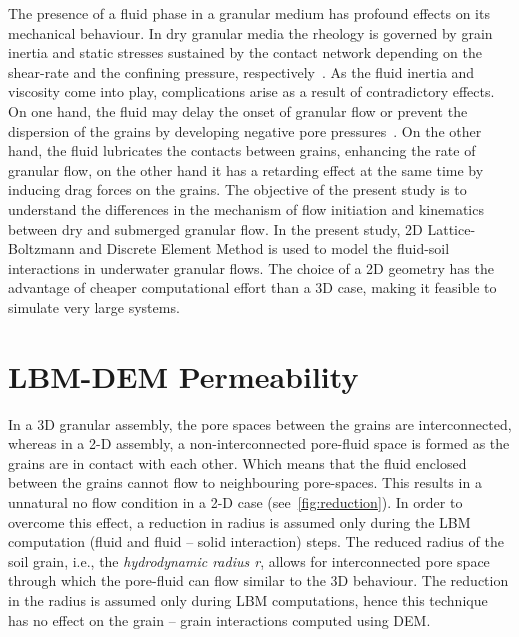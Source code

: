 The presence of a fluid phase in a granular medium has profound effects on its 
mechanical behaviour. In dry granular media the rheology is governed by grain 
inertia and static stresses sustained by the contact network depending on the 
shear-rate and the confining pressure, respectively~\citep{Midi2004}. As the 
fluid inertia and viscosity come into play, complications arise as a result of 
contradictory effects. On one hand, the fluid may delay the onset of
granular flow or prevent the dispersion of the grains by
developing negative pore pressures~\citep{Pailha2008,Topin2011}. On the other
hand, the fluid lubricates the contacts between grains, enhancing the rate of 
granular flow, on the other hand it has a retarding effect at the same time by 
inducing drag forces on the grains. The objective of the present study is to 
understand 
the differences in the mechanism of flow initiation and kinematics between dry 
and submerged granular flow. In the present study, 2D Lattice-Boltzmann and 
Discrete Element Method is used to model the fluid-soil interactions in  
underwater granular flows.  The choice of a 2D geometry has the advantage of 
cheaper computational effort than a 3D case, making it feasible to 
simulate very large systems. 



\section{LBM-DEM Permeability}

In a 3D granular assembly, the pore spaces between the grains are 
interconnected, whereas in a 2-D assembly, a non-interconnected pore-fluid 
space is formed as the grains are in contact with each 
other. Which means that the fluid enclosed between the grains cannot flow 
to neighbouring pore-spaces.  This results in a unnatural no flow condition in 
a 2-D case (see~\cref{fig:reduction}). In order to overcome this effect, a 
reduction in radius is assumed only during the LBM computation (fluid and fluid 
– solid interaction) steps. The reduced radius of the soil grain, i.e., the 
\textit{hydrodynamic radius r}, allows for interconnected pore space through 
which the pore-fluid can flow similar to the 3D behaviour. The reduction in 
the radius is assumed only during LBM computations, hence this technique has no 
effect on the grain – grain interactions computed using DEM. 

